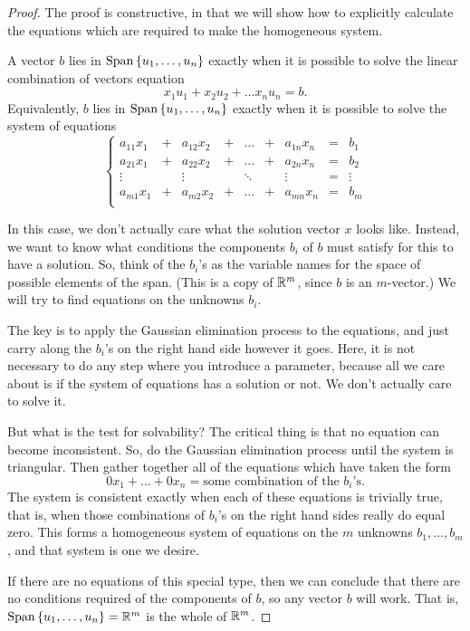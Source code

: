 \documentclass[00-livre-main.tex]{subfiles}
\begin{document}
\begin{proof}
The proof is constructive, in that we will show how to explicitly calculate the equations which are required to make the homogeneous system.

A vector $b$ lies in $\mathrm{Span}\left\{ u_1,\ldots,u_n \right\}$ exactly when it is possible to solve the linear combination of vectors equation
\[
x_1 u_1 + x_2 u_2 + \dots x_n u_n = b.
\]
Equivalently, $b$ lies in $\mathrm{Span}\left\{ u_1,\ldots,u_n \right\}$ exactly when it is possible to solve the system of equations
\[
\left\{\begin{array}{rrrrrrrrr}
a_{11}x_1 & + & a_{12} x_2 & + & \dots & + & a_{1n}x_n & = & b_1 \\
a_{21}x_1 & + & a_{22} x_2 & + & \dots & + & a_{2n}x_n & = & b_2 \\
\vdots &  & \vdots &  & \ddots & & \vdots & = & \vdots \\
a_{m1}x_1 & + & a_{m2} x_2 & + & \dots & + & a_{mn}x_n & = & b_m \\
\end{array}\right. 
\]


In this case, we don't actually care what the solution vector $x$ looks like. Instead, we want to know what conditions the components $b_i$ of $b$ must satisfy for this to have a solution. So, think of the $b_i$'s as the variable names for the space of possible elements of the span. (This is a copy of $\mathbb{R}^m$, since $b$ is an $m$-vector.) We will try to find equations on the unknowns $b_i$.

The key is to apply the Gaussian elimination process to the equations, and just carry along the $b_i$'s on the right hand side however it goes. Here, it is not necessary to do any step where you introduce a parameter, because all we care about is if the system of equations has a solution or not. We don't actually care to solve it.

But what is the test for solvability? The critical thing is that no equation can become inconsistent. So, do the Gaussian elimination process until the system is triangular. Then gather together all of the equations which have taken the form 
\[
0x_1 + \ldots + 0 x_n = \text{some combination of the $b_i$'s}.
\]
The system is consistent exactly when each of these equations is trivially true, that is, when those combinations of $b_i$'s on the right hand sides really do equal zero.
This forms a homogeneous system of equations on the $m$ unknowns $b_1, \dots, b_m$, and that system is one we desire.

If there are no equations of this special type, then we can conclude that there are no conditions required of the components of $b$, so any vector $b$ will work. That is,
$\mathrm{Span}\left\{ u_1,\ldots,u_n \right\} = \mathbb{R}^m$ is the whole of $\mathbb{R}^m$.
\end{proof}
\end{document}
